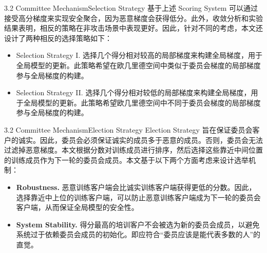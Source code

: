 \documentclass{sintefbeamer}
\theoremstyle{definition}
\begin{document}
\begin{frame}{3.2 Committee Mechanism}{Selection Strategy}
基于上述 Scoring System 可以通过接受高分梯度来实现安全聚合，因为恶意梯度会获得低分。此外，收敛分析和实验结果表明，相反的策略在非攻击场景中表现更好。因此，针对不同的考虑，本文还设计了两种相反的选择策略如下：
\begin{itemize}
\item Selection Strategy I. 选择几个得分相对较高的局部梯度来构建全局梯度，用于全局模型的更新。此策略希望在欧几里德空间中类似于委员会梯度的局部梯度参与全局梯度的构建。
\item Selection Strategy II. 选择几个得分相对较低的局部梯度来构建全局梯度，用于全局模型的更新。此策略希望欧几里德空间中不同于委员会梯度的局部梯度参与全局梯度的构建。
\end{itemize}
\end{frame}

\begin{frame}{3.2 Committee Mechanism}{Election Strategy}
Election Strategy 旨在保证委员会客户的诚实。因此，委员会必须保证诚实的成员多于恶意的成员。否则，委员会无法过滤掉恶意梯度。本文根据分数对训练成员进行排序，然后选择这些靠近中间位置的训练成员作为下一轮的委员会成员。本文基于以下两个方面考虑来设计选举机制：
\begin{itemize}
\item \textbf{Robustness. } 恶意训练客户端会比诚实训练客户端获得更低的分数。因此，选择靠近中上位的训练客户端，可以防止恶意训练客户端成为下一轮的委员会客户端，从而保证全局模型的安全性。
\item \textbf{System Stability. } 得分最高的培训客户不会被选为新的委员会成员，以避免系统过于依赖委员会成员的初始化。即应符合“委员应该是能代表多数的人”的直觉。
\end{itemize}


\end{frame}
\end{document}

